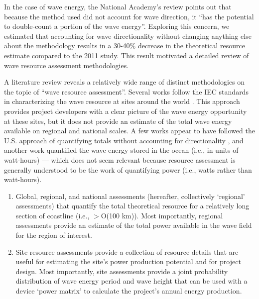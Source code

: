 In the case of wave energy, the National Academy’s review points out that
because the method used did not account for wave direction, it “has the
potential to double-count a portion of the wave energy”. Exploring this concern,
we estimated that accounting for wave directionality without changing anything
else about the methodology results in a 30-40\% decrease in the theoretical
resource estimate compared to the 2011 study. This result motivated a detailed
review of wave resource assessment methodologies.

A literature review reveals a relatively wide range of distinct methodologies on
the topic of “wave resource assessment”. Several works follow the IEC standards
in characterizing the wave resource at sites around the world
\citep{zhengAssessingChinaSea2013,neillWavePowerVariability2013,iglesiasWaveEnergyPotential2009,sierraWaveEnergyResource2013,robertsonCharacterizingShoreWave2014,internationalelectrotechnicalcommissionPart101Wave2015}.
This approach provides project developers with a clear picture of the wave
energy opportunity at these sites, but it does not provide an estimate of the
total wave energy available on regional and national scales. A few works appear
to have followed the U.S. approach of quantifying totals without accounting for
directionality \citep{kumarWaveEnergyResource2015}, and another work quantified
the wave energy stored in the ocean \citep{hughesNationalscaleWaveEnergy2010}
(i.e., in units of watt-hours) — which does
not seem relevant because resource assessment is generally understood to be the
work of quantifying power (i.e., watts rather than watt-hours).

\begin{enumerate}
\item Global, regional, and national assessments (hereafter, collectively ‘regional’ assessments) that quantify the total theoretical resource for a relatively long section of coastline (i.e., $>$O(100 km)). Most importantly, regional assessments provide an estimate of the total power available in the wave field for the region of interest.
\item Site resource assessments provide a collection of resource details that are useful for estimating the site’s power production potential and for project design. Most importantly, site assessments provide a joint probability distribution of wave energy period and wave height that can be used with a device ‘power matrix’ to calculate the project’s annual energy production.
\end{enumerate}

